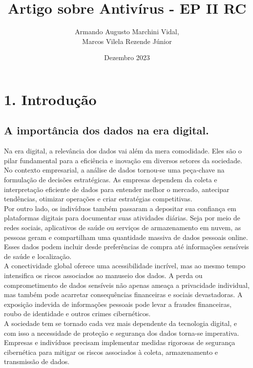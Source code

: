 \documentclass[10pt,conference,twocolumn]{article}
\title{Artigo sobre Antivírus - EP II RC}
\author{Armando Augusto Marchini Vidal,\\
Marcos Vilela Rezende Júnior}
\date{Dezembro 2023}
\begin{document}
\maketitle

\section* {1. Introdução}

\subsection*{A importância dos dados na era digital.}
Na era digital, a relevância dos dados vai além da mera comodidade. Eles são o pilar fundamental para a eficiência e inovação em diversos setores da sociedade. No contexto empresarial, a análise de dados tornou-se uma peça-chave na formulação de decisões estratégicas. As empresas dependem da coleta e interpretação eficiente de dados para entender melhor o mercado, antecipar tendências, otimizar operações e criar estratégias competitivas.\\
Por outro lado, os indivíduos também passaram a depositar sua confiança em plataformas digitais para documentar suas atividades diárias. Seja por meio de redes sociais, aplicativos de saúde ou serviços de armazenamento em nuvem, as pessoas geram e compartilham uma quantidade massiva de dados pessoais online. Esses dados podem incluir desde preferências de compra até informações sensíveis de saúde e localização.\\
A conectividade global oferece uma acessibilidade incrível, mas ao mesmo tempo intensifica os riscos associados ao manuseio dos dados. A perda ou comprometimento de dados sensíveis não apenas ameaça a privacidade individual, mas também pode acarretar consequências financeiras e sociais devastadoras. A exposição indevida de informações pessoais pode levar a fraudes financeiras, roubo de identidade e outros crimes cibernéticos.\\
A sociedade tem se tornado cada vez mais dependente da tecnologia digital, e com isso a necessidade de proteção e segurança dos dados torna-se imperativa. Empresas e indivíduos precisam implementar medidas rigorosas de segurança cibernética para mitigar os riscos associados à coleta, armazenamento e transmissão de dados.
\end{document}
